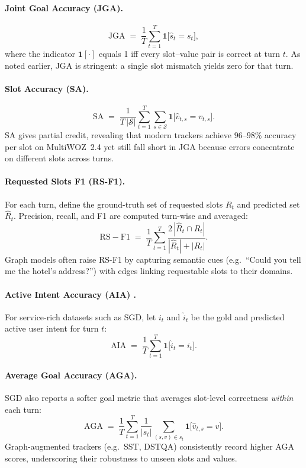 \documentclass[11pt]{article}
\begin{document}
\paragraph{Joint Goal Accuracy (JGA).}
\[
\mathrm{JGA} \;=\; \frac{1}{T}\sum_{t=1}^{T}\mathbf{1}\bigl[\hat{s}_t = s_t\bigr],
\]
where the indicator \(\mathbf{1}[\cdot]\) equals 1 iff every slot–value pair is correct at turn \(t\).  As noted earlier, JGA is stringent: a single slot mismatch yields zero for that turn.

\paragraph{Slot Accuracy (SA).}
\[
\mathrm{SA} \;=\; 
\frac{1}{T\,|\mathcal{S}|}\sum_{t=1}^{T}\sum_{s\in\mathcal{S}}
\mathbf{1}\bigl[\hat{v}_{t,s}=v_{t,s}\bigr].
\]
SA gives partial credit, revealing that modern trackers achieve \(96\text{–}98\%\) accuracy per slot on \mbox{MultiWOZ~2.4} yet still fall short in JGA because errors concentrate on different slots across turns.

\paragraph{Requested Slots F1 (RS-F1).}
For each turn, define the ground-truth set of requested slots \(R_t\) and predicted set \(\hat{R}_t\).  Precision, recall, and F1 are computed turn-wise and averaged:
\[
\mathrm{RS\!-\!F1} \;=\; 
\frac{1}{T}\sum_{t=1}^{T}
\frac{2\,|\hat{R}_t\cap R_t|}{|\hat{R}_t|+|R_t|}.
\]
Graph models often raise RS-F1 by capturing semantic cues (e.g.\ “Could you tell me the hotel’s address?”) with edges linking requestable slots to their domains.

\paragraph{Active Intent Accuracy (AIA) \citep{Rastogi2020SGD}.}
For service-rich datasets such as SGD, let \(i_t\) and \(\hat{i}_t\) be the gold and predicted active user intent for turn \(t\):
\[
\mathrm{AIA} \;=\; \frac{1}{T}\sum_{t=1}^{T}\mathbf{1}\bigl[\hat{i}_t=i_t\bigr].
\]

\paragraph{Average Goal Accuracy (AGA).}
SGD also reports a softer goal metric that averages slot-level correctness \emph{within} each turn:
\[
\mathrm{AGA} \;=\;
\frac{1}{T}\sum_{t=1}^{T}
\frac{1}{|s_t|}\sum_{(s,v)\in s_t}\mathbf{1}\bigl[\hat{v}_{t,s}=v\bigr].
\]
Graph-augmented trackers (e.g.\ SST, DSTQA) consistently record higher AGA scores, underscoring their robustness to unseen slots and values.
\end{document}
